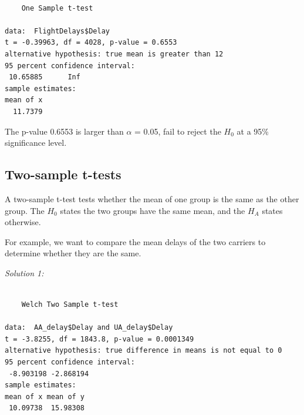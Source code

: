 \documentclass[
  letterpaper,
  DIV=11,
  numbers=noendperiod]{scrreprt}
\newenvironment{Shaded}{\begin{snugshade}}{\end{snugshade}}
\newcommand{\AttributeTok}[1]{\textcolor[rgb]{0.40,0.45,0.13}{#1}}
\newcommand{\DecValTok}[1]{\textcolor[rgb]{0.68,0.00,0.00}{#1}}
\newcommand{\FunctionTok}[1]{\textcolor[rgb]{0.28,0.35,0.67}{#1}}
\newcommand{\NormalTok}[1]{\textcolor[rgb]{0.00,0.23,0.31}{#1}}
\newcommand{\OtherTok}[1]{\textcolor[rgb]{0.00,0.23,0.31}{#1}}
\newcommand{\SpecialCharTok}[1]{\textcolor[rgb]{0.37,0.37,0.37}{#1}}
\newcommand{\StringTok}[1]{\textcolor[rgb]{0.13,0.47,0.30}{#1}}
\begin{document}
\begin{Shaded}
\end{Shaded}

\begin{verbatim}

    One Sample t-test

data:  FlightDelays$Delay
t = -0.39963, df = 4028, p-value = 0.6553
alternative hypothesis: true mean is greater than 12
95 percent confidence interval:
 10.65885      Inf
sample estimates:
mean of x 
  11.7379 
\end{verbatim}

The p-value 0.6553 is larger than \(\alpha\) = 0.05, fail to reject the
\(H_{0}\) at a 95\% significance level.

\subsection{Two-sample t-tests}\label{sec-04-two-sample-t-test}

A two-sample t-test tests whether the mean of one group is the same as
the other group. The \(H_{0}\) states the two groups have the same mean,
and the \(H_{A}\) states otherwise.

For example, we want to compare the mean delays of the two carriers to
determine whether they are the same.

\emph{Solution 1:}

\begin{Shaded}
\end{Shaded}

\begin{verbatim}

    Welch Two Sample t-test

data:  AA_delay$Delay and UA_delay$Delay
t = -3.8255, df = 1843.8, p-value = 0.0001349
alternative hypothesis: true difference in means is not equal to 0
95 percent confidence interval:
 -8.903198 -2.868194
sample estimates:
mean of x mean of y 
 10.09738  15.98308 
\end{verbatim}
\end{document}

